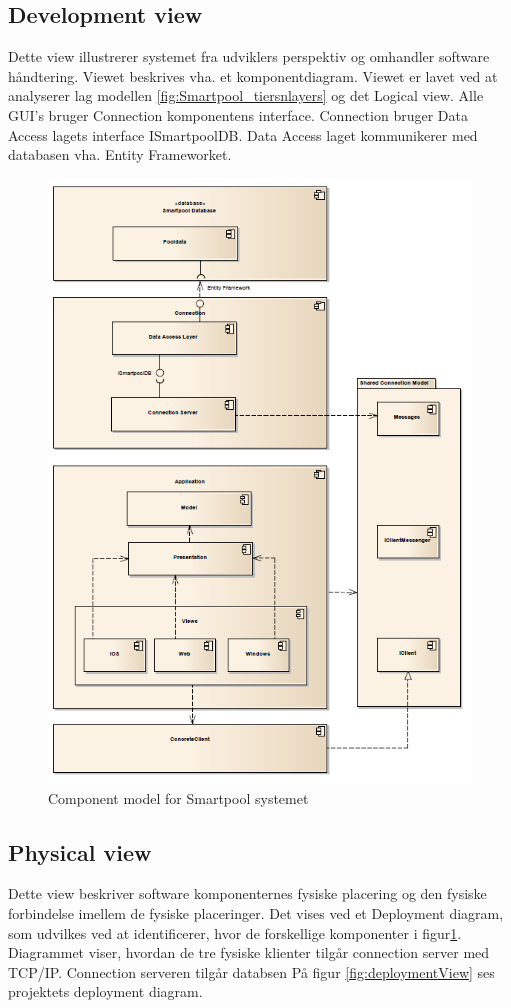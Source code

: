 \subsection{Development view}
Dette view illustrerer systemet fra udviklers perspektiv og omhandler software håndtering. Viewet beskrives vha. et komponentdiagram. Viewet er lavet ved at analyserer lag modellen \ref{fig:Smartpool_tiersnlayers} og det Logical view. Alle GUI's bruger Connection komponentens interface. Connection bruger Data Access lagets interface ISmartpoolDB. Data Access laget kommunikerer med databasen vha. Entity Frameworket.


\begin{figure}
\centering
\includegraphics[width=0.7\linewidth]{figs/arkitektur/componentModel}
\caption{Component model for Smartpool systemet}
\label{fig:componentModel}
\end{figure}

\subsection{Physical view}
Dette view beskriver software komponenternes fysiske placering og den fysiske forbindelse imellem de fysiske placeringer. Det vises ved et Deployment diagram, som udvilkes ved at identificerer, hvor de forskellige komponenter i figur\ref{fig:componentModel}. Diagrammet viser, hvordan de tre fysiske klienter tilgår connection server med TCP/IP. Connection serveren tilgår databsen 
På figur \ref{fig:deploymentView} ses projektets deployment diagram.

